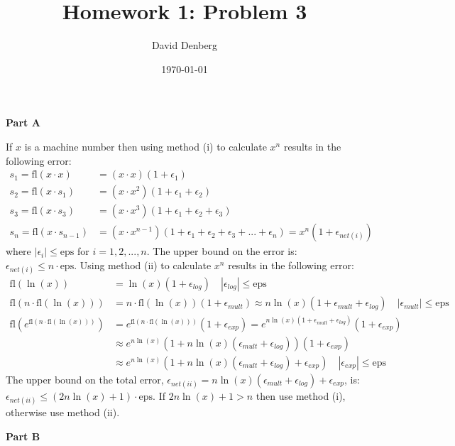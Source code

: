 \documentclass[12pt]{article}
\title{Homework 1: Problem 3}
\author{David Denberg}
\date{\today}
\begin{document}
\maketitle
\noindent
\textbf{Part A}

If $x$ is a machine number then using method (i) to calculate $x^n$ results in the following error:
\begin{align*}
s_1 = \mathrm{fl}(x \cdot x) &= (x \cdot x)(1 + \epsilon_1) \\
s_2 = \mathrm{fl}(x \cdot s_1) &= (x \cdot x^2)(1 + \epsilon_1 + \epsilon_2) \\
s_3 = \mathrm{fl}(x \cdot s_3) &= (x \cdot x^3)(1 + \epsilon_1 + \epsilon_2 + \epsilon_3) \\
s_n = \mathrm{fl}(x \cdot s_{n-1}) &= (x \cdot x^{n-1})(1 + \epsilon_1 + \epsilon_2 + \epsilon_3 + ... + \epsilon_n) = x^n(1 + \epsilon_{net (i)})
\end{align*}
where $|\epsilon_i| \le \mathrm{eps}$ for $i = 1,2,...,n$. The upper bound on the error is: $\epsilon_{net (i)} \le n \cdot \mathrm{eps}$. Using method (ii) to calculate $x^n$ results in the following error:
\begin{align*}
\mathrm{fl}(\ln(x)) &= \ln(x)(1 + \epsilon_{log}) \quad |\epsilon_{log}| \le \mathrm{eps}
\\
\mathrm{fl}(n \cdot \mathrm{fl}(\ln(x))) &= n \cdot \mathrm{fl}(\ln(x))(1 + \epsilon_{mult}) \approx n \ln(x) (1 + \epsilon_{mult} + \epsilon_{log}) \quad |\epsilon_{mult}| \le \mathrm{eps}
\\
\mathrm{fl}(e^{\mathrm{fl}(n \cdot \mathrm{fl}(\ln(x)))}) &= e^{\mathrm{fl}(n \cdot \mathrm{fl}(\ln(x)))} (1 + \epsilon_{exp}) = e^{n \ln(x) (1 + \epsilon_{mult} + \epsilon_{log})}(1 + \epsilon_{exp})
\\
&\approx e^{n \ln(x)}(1 + n \ln(x) (\epsilon_{mult} + \epsilon_{log}))(1 + \epsilon_{exp})
\\
&\approx e^{n \ln(x)}(1 + n \ln(x) (\epsilon_{mult} + \epsilon_{log}) + \epsilon_{exp}) \quad |\epsilon_{exp}| \le \mathrm{eps}
\end{align*}
The upper bound on the total error, $\epsilon_{net(ii)} = n \ln(x) (\epsilon_{mult} + \epsilon_{log}) + \epsilon_{exp}$, is: $\epsilon_{net(ii)} \le (2 n \ln(x) + 1) \cdot \mathrm{eps}$. If $2 n \ln(x) + 1 > n$ then use method (i), otherwise use method (ii).

\noindent
\textbf{Part B}
\end{document}
